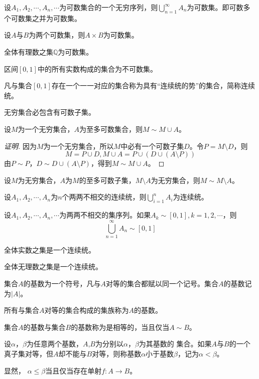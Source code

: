     \begin{Thm}
    设$A_1, A_2, \cdots, A_n, \cdots$为可数集合的一个无穷序列，则$\bigcup_{n=1}^{\infty}A_n$为可数集。即可数多个可数集之并为可数集。
  \end{Thm}
  \begin{Thm}
    设$A$与$B$为两个可数集，则$A\times B$为可数集。
  \end{Thm}
  \begin{Thm}
    全体有理数之集$\mathbb{Q}$为可数集。
  \end{Thm}
  \begin{Thm}
    区间$[0,1]$中的所有实数构成的集合为不可数集。
  \end{Thm}
  \begin{Def}
    凡与集合$[0,1]$存在一个一一对应的集合称为具有“连续统的势”的集合，简称连续统。
  \end{Def}
    \begin{Thm}
    无穷集合必包含有可数子集。
  \end{Thm}
  \begin{Thm}
    设$M$为一个无穷集合，$A$为至多可数集合，则$M \sim M \cup A$。
  \end{Thm}
  \begin{proof}[证明]
    因为$M$为一个无穷集合，所以$M$中必有一个可数子集$D$。令$P=M\setminus D$，则
    \[M=P\cup D, M\cup A = P\cup (D\cup (A\setminus P))\]
    由$P\sim P$，$D\sim D\cup (A\setminus P)$，得到$M\sim M\cup A$。
  \end{proof}
  \begin{Thm}
    设$M$为无穷集合，$A$为$M$的至多可数子集，$M\setminus A$为无穷集合，则$M \sim M\setminus A$。
  \end{Thm}
  \begin{Thm}
    设$A_1, A_2, \cdots, A_n$为$n$个两两不相交的连续统，则$\bigcup_{i=1}^nA_i$为连续统。
  \end{Thm}
  \begin{Thm}
    设$A_1, A_2, \cdots, A_n, \cdots$为两两不相交的集序列。如果$A_k \sim [0,1], k = 1, 2, \cdots$，则
    \[\bigcup_{n=1}^{\infty}A_n \sim [0,1]\]
  \end{Thm}
 \begin{Cor}
   全体实数之集是一个连续统。
 \end{Cor}
 \begin{Cor}
   全体无理数之集是一个连续统。
 \end{Cor}
  \begin{Def}
    集合$A$的基数为一个符号，凡与$A$对等的集合都赋以同一个记号。集合$A$的基数记为$|A|$。
  \end{Def}
  \begin{Def}
    所有与集合$A$对等的集合构成的集族称为$A$的基数。
  \end{Def}
    \begin{Def}
    集合$A$的基数与集合$B$的基数称为是相等的，当且仅当$A \sim B$。
  \end{Def}
  \begin{Def}
    设$\alpha$，$\beta$为任意两个基数，$A$,$B$为分别以$\alpha$，$\beta$为其基数的
    集合。如果$A$与$B$的一个真子集对等，但$A$却不能与$B$对等，则称基数$\alpha$小于基数$\beta$，记为$\alpha < \beta$。
  \end{Def}
  显然，
  $\alpha \leq \beta$当且仅当存在单射$f:A \to B$。

